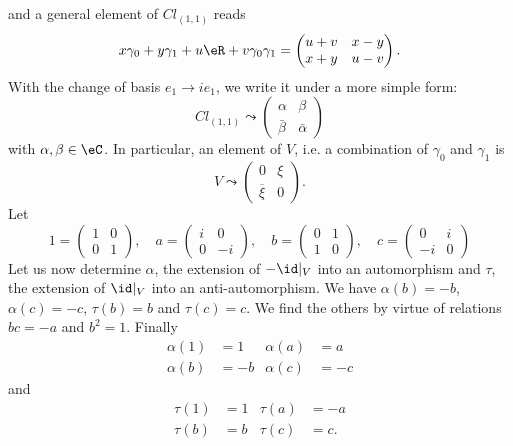 and a general element of $Cl_{(1,1)}$ reads
\[
	x\gamma_0+y\gamma_1+u\eR+v\gamma_0\gamma_1=
	\begin{pmatrix}
		u+v & x-y \\
		x+y & u-v
	\end{pmatrix}.
\]
With the change of basis $e_1\to ie_1$, we write it under a more simple form:
\begin{equation}
	Cl_{(1,1)}\leadsto
	\begin{pmatrix}
		\alpha    & \beta      \\
		\bar\beta & \bar\alpha
	\end{pmatrix}
\end{equation}
with $\alpha,\beta\in\eC$. In particular, an element of $V$, i.e. a combination of $\gamma_0$ and $\gamma_1$ is
\begin{equation}
	V\leadsto
	\begin{pmatrix}
		0              & \xi \\
		\overline{\xi} & 0
	\end{pmatrix}.
\end{equation}
Let
\[
	1=
	\begin{pmatrix}
		1 & 0 \\0&1
	\end{pmatrix},
	\quad
	a=
	\begin{pmatrix}
		i & 0 \\0&-i
	\end{pmatrix},
	\quad b=
	\begin{pmatrix}
		0 & 1 \\1&0
	\end{pmatrix},
	\quad
	c=
	\begin{pmatrix}
		0 & i \\-i&0
	\end{pmatrix}
\]
Let us now determine $\alpha$, the extension of $-\id|_V$ into an automorphism and $\tau$, the extension of $\id|_V$ into an anti-automorphism. We have $\alpha(b)=-b$, $\alpha(c)=-c$, $\tau(b)=b$ and $\tau(c)=c$. We find the others by virtue of relations $bc=-a$ and $b^2=1$. Finally
\begin{equation}
	\begin{aligned}
		\alpha(1) & =1  & \alpha(a) & =a  \\
		\alpha(b) & =-b & \alpha(c) & =-c
	\end{aligned}
\end{equation}
and
\begin{equation}
	\begin{aligned}
		\tau(1) & =1 & \tau(a) & =-a \\
		\tau(b) & =b & \tau(c) & =c.
	\end{aligned}
\end{equation}

